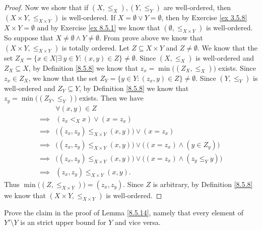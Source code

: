 \begin{proof}
    Now we show that if \((X, \leq_X), (Y, \leq_Y)\) are well-ordered, then \((X \times Y, \leq_{X \times Y})\) is well-ordered.
    If \(X = \emptyset \lor Y = \emptyset\), then by Exercise \ref{ex 3.5.8} \(X \times Y = \emptyset\) and by Exercise \ref{ex 8.5.1} we know that \((\emptyset, \leq_{X \times Y})\) is well-ordered.
    So suppose that \(X \neq \emptyset \land Y \neq \emptyset\).
    From prove above we know that \((X \times Y, \leq_{X \times Y})\) is totally ordered.
    Let \(Z \subseteq X \times Y\) and \(Z \neq \emptyset\).
    We know that the set \(Z_X = \{x \in X | \exists\ y \in Y : (x, y) \in Z\} \neq \emptyset\).
    Since \((X, \leq_X)\) is well-ordered and \(Z_X \subseteq X\), by Definition \ref{8.5.8} we know that \(z_x = \min\big((Z_X, \leq_X)\big)\) exists.
    Since \(z_x \in Z_X\), we know that the set \(Z_Y = \{y \in Y : (z_x, y) \in Z\} \neq \emptyset\).
    Since \((Y, \leq_Y)\) is well-ordered and \(Z_Y \subseteq Y\), by Definition \ref{8.5.8} we know that \(z_y = \min\big((Z_Y, \leq_Y)\big)\) exists.
    Then we have
    \begin{align*}
                 & \forall (x, y) \in Z                                                                        \\
        \implies & (z_x <_X x) \lor (x = z_x)                                                                  \\
        \implies & \big((z_x, z_y) \leq_{X \times Y} (x, y)\big) \lor (x = z_x)                                \\
        \implies & \big((z_x, z_y) \leq_{X \times Y} (x, y)\big) \lor \big((x = z_x) \land (y \in Z_y)\big)    \\
        \implies & \big((z_x, z_y) \leq_{X \times Y} (x, y)\big) \lor \big((x = z_x) \land (z_y \leq_Y y)\big) \\
        \implies & (z_x, z_y) \leq_{X \times Y} (x, y).
    \end{align*}
    Thus \(\min\big((Z, \leq_{X \times Y})\big) = (z_x, z_y)\).
    Since \(Z\) is arbitrary, by Definition \ref{8.5.8} we know that \((X \times Y, \leq_{X \times Y})\) is well-ordered.
\end{proof}

\begin{exercise}\label{ex 8.5.13}
    Prove the claim in the proof of Lemma \ref{8.5.14}, namely that every element of \(Y' \setminus Y\) is an strict upper bound for \(Y\) and vice versa.
\end{exercise}

